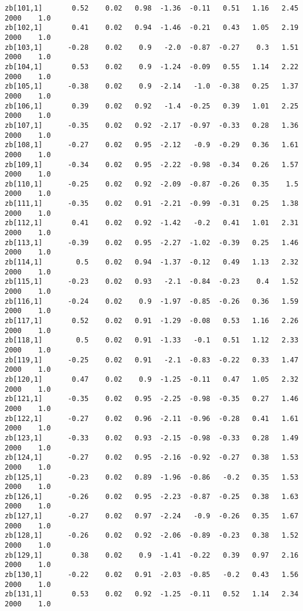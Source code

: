 \documentclass[11pt]{article}
\begin{document}
\begin{Verbatim}[commandchars=\\\{\}]
zb[101,1]       0.52    0.02   0.98  -1.36  -0.11   0.51   1.16   2.45   2000    1.0
zb[102,1]       0.41    0.02   0.94  -1.46  -0.21   0.43   1.05   2.19   2000    1.0
zb[103,1]      -0.28    0.02    0.9   -2.0  -0.87  -0.27    0.3   1.51   2000    1.0
zb[104,1]       0.53    0.02    0.9  -1.24  -0.09   0.55   1.14   2.22   2000    1.0
zb[105,1]      -0.38    0.02    0.9  -2.14   -1.0  -0.38   0.25   1.37   2000    1.0
zb[106,1]       0.39    0.02   0.92   -1.4  -0.25   0.39   1.01   2.25   2000    1.0
zb[107,1]      -0.35    0.02   0.92  -2.17  -0.97  -0.33   0.28   1.36   2000    1.0
zb[108,1]      -0.27    0.02   0.95  -2.12   -0.9  -0.29   0.36   1.61   2000    1.0
zb[109,1]      -0.34    0.02   0.95  -2.22  -0.98  -0.34   0.26   1.57   2000    1.0
zb[110,1]      -0.25    0.02   0.92  -2.09  -0.87  -0.26   0.35    1.5   2000    1.0
zb[111,1]      -0.35    0.02   0.91  -2.21  -0.99  -0.31   0.25   1.38   2000    1.0
zb[112,1]       0.41    0.02   0.92  -1.42   -0.2   0.41   1.01   2.31   2000    1.0
zb[113,1]      -0.39    0.02   0.95  -2.27  -1.02  -0.39   0.25   1.46   2000    1.0
zb[114,1]        0.5    0.02   0.94  -1.37  -0.12   0.49   1.13   2.32   2000    1.0
zb[115,1]      -0.23    0.02   0.93   -2.1  -0.84  -0.23    0.4   1.52   2000    1.0
zb[116,1]      -0.24    0.02    0.9  -1.97  -0.85  -0.26   0.36   1.59   2000    1.0
zb[117,1]       0.52    0.02   0.91  -1.29  -0.08   0.53   1.16   2.26   2000    1.0
zb[118,1]        0.5    0.02   0.91  -1.33   -0.1   0.51   1.12   2.33   2000    1.0
zb[119,1]      -0.25    0.02   0.91   -2.1  -0.83  -0.22   0.33   1.47   2000    1.0
zb[120,1]       0.47    0.02    0.9  -1.25  -0.11   0.47   1.05   2.32   2000    1.0
zb[121,1]      -0.35    0.02   0.95  -2.25  -0.98  -0.35   0.27   1.46   2000    1.0
zb[122,1]      -0.27    0.02   0.96  -2.11  -0.96  -0.28   0.41   1.61   2000    1.0
zb[123,1]      -0.33    0.02   0.93  -2.15  -0.98  -0.33   0.28   1.49   2000    1.0
zb[124,1]      -0.27    0.02   0.95  -2.16  -0.92  -0.27   0.38   1.53   2000    1.0
zb[125,1]      -0.23    0.02   0.89  -1.96  -0.86   -0.2   0.35   1.53   2000    1.0
zb[126,1]      -0.26    0.02   0.95  -2.23  -0.87  -0.25   0.38   1.63   2000    1.0
zb[127,1]      -0.27    0.02   0.97  -2.24   -0.9  -0.26   0.35   1.67   2000    1.0
zb[128,1]      -0.26    0.02   0.92  -2.06  -0.89  -0.23   0.38   1.52   2000    1.0
zb[129,1]       0.38    0.02    0.9  -1.41  -0.22   0.39   0.97   2.16   2000    1.0
zb[130,1]      -0.22    0.02   0.91  -2.03  -0.85   -0.2   0.43   1.56   2000    1.0
zb[131,1]       0.53    0.02   0.92  -1.25  -0.11   0.52   1.14   2.34   2000    1.0

\end{Verbatim}
\end{document}
